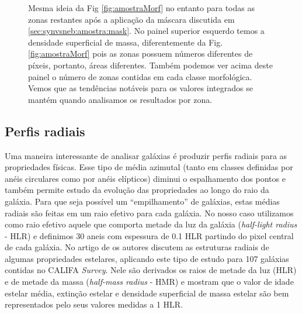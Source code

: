 \begin{figure}
	\centering
	\caption[Classificação por morfologia após máscara.]
	{Mesma ideia da Fig \ref{fig:amostraMorf} no entanto para todas as zonas restantes após a
	aplicação da máscara discutida em \ref{sec:synvsneb:amostra:mask}. No painel superior esquerdo
	temos a densidade superficial de massa, diferentemente da Fig. \ref{fig:amostraMorf} pois as zonas
	possuem números diferentes de píxeis, portanto, áreas diferentes. Também podemos ver acima deste
	painel o número de zonas contidas em cada classe morfológica. Vemos que as tendências notáveis para
	os valores integrados se mantém quando analisamos os resultados por zona.}
	\label{fig:amostraRealMorf}
\end{figure}

\subsection{Perfis radiais}
\label{sec:synvsneb:amostra:rad}

Uma maneira interessante de analisar galáxias é produzir perfis radiais para as propriedades
físicas. Esse tipo de média azimutal (tanto em classes definidas por anéis circulares como por
anéis elípticos) diminui o espalhamento dos pontos e também permite estudo da evolução das
propriedades ao longo do raio da galáxia. Para que seja possível um ``empilhamento'' de galáxias,
estas médias radiais são feitas em um raio efetivo para cada galáxia. No nosso caso utilizamos como raio
efetivo aquele que comporta metade da luz da galáxia ({\em half-light radius} - HLR) e definimos 30
aneis com espessura de 0.1 HLR partindo do pixel central de cada galáxia. No artigo de
\citet{GonzalezDelgado.etal.2014a} os autores discutem as estruturas radiais de algumas propriedades
estelares, aplicando este tipo de estudo para 107 galáxias contidas no CALIFA {\em Survey}. Nele são
derivados os raios de metade da luz (HLR) e de metade da massa ({\em half-mass radius} - HMR) e
mostram que o valor de idade estelar média, extinção estelar e densidade superficial de massa
estelar são bem representados pelo seus valores medidas a 1 HLR.

